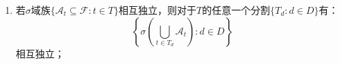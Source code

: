 \begin{property}
\begin{enumerate}
\begin{enumerate}
			\item 设$g$是$(\mathbb{R}^{n},\mathcal{B}(\mathbb{R}^{n}))$上的可测函数，对任意的$n\in\mathbb{N}^+$（$T$为有限集时对应条件为$n\in\mathbb{N}^+$且$n\leqslant|T|$）和$\seq{t}{n}\in T$，记$f=(f_{t_1},f_{t_2},\dots,f_{t_n})$，只要：
			\begin{equation*}
				\int_{X}g(f_{t_1},f_{t_2},\dots,f_{t_n})\dif P,\quad\int_{\mathbb{R}}\dif Pf_{t_1}^{-1}\int_{\mathbb{R}}\dif Pf_{t_2}^{-1}\cdots\int_{\mathbb{R}}g(\seq{x}{n})\dif Pf_{t_n}^{-1}
			\end{equation*}
			之一有意义，二者一定相等。
		\end{enumerate}
		\item 若$\sigma$域族$\{\mathscr{A}_t\subseteq\mathscr{F}:t\in T\}$相互独立，则对于$T$的任意一个分割$\{T_d:d\in D\}$有：
		\begin{equation*}
			\left\{\sigma\left(\underset{t\in T_d}{\overset{}{\bigcup}}\mathscr{A}_t\right):d\in D\right\}
		\end{equation*}
		相互独立；
	\end{enumerate}
\end{property}
